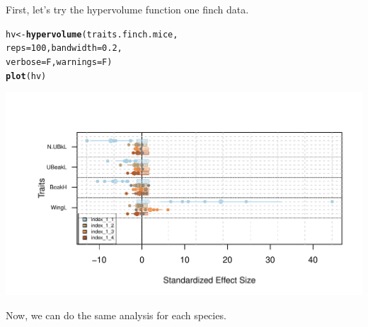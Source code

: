 \documentclass[12pt]{article}\usepackage[]{graphicx}\usepackage[]{color}
\makeatletter
\def\maxwidth{ %
  \ifdim\Gin@nat@width>\linewidth
    \linewidth
  \else
    \Gin@nat@width
  \fi
}
\newcommand{\hlnum}[1]{\textcolor[rgb]{0.686,0.059,0.569}{#1}}%
\newcommand{\hlstd}[1]{\textcolor[rgb]{0.345,0.345,0.345}{#1}}%
\newcommand{\hlkwb}[1]{\textcolor[rgb]{0.69,0.353,0.396}{#1}}%
\newcommand{\hlkwc}[1]{\textcolor[rgb]{0.333,0.667,0.333}{#1}}%
\newcommand{\hlkwd}[1]{\textcolor[rgb]{0.737,0.353,0.396}{\textbf{#1}}}%
\newenvironment{kframe}{%
 \def\at@end@of@kframe{}%
 \ifinner\ifhmode%
  \def\at@end@of@kframe{\end{minipage}}%
  \begin{minipage}{\columnwidth}%
 \fi\fi%
 \def\FrameCommand##1{\hskip\@totalleftmargin \hskip-\fboxsep
 \colorbox{shadecolor}{##1}\hskip-\fboxsep
     \hskip-\linewidth \hskip-\@totalleftmargin \hskip\columnwidth}%
 \MakeFramed {\advance\hsize-\width
   \@totalleftmargin\z@ \linewidth\hsize
   \@setminipage}}%
 {\par\unskip\endMakeFramed%
 \at@end@of@kframe}
\newenvironment{knitrout}{}{} %
\makeatother
\begin{document}
First, let's try the hypervolume function one finch data.
\begin{knitrout}
\color{fgcolor}\begin{kframe}
\begin{alltt}
\hlstd{hv}\hlkwb{<-}\hlkwd{hypervolume}\hlstd{(traits.finch.mice,}
                \hlkwc{reps}\hlstd{=}\hlnum{100}\hlstd{,}\hlkwc{bandwidth}\hlstd{=}\hlnum{0.2}\hlstd{,}
                \hlkwc{verbose}\hlstd{=F,} \hlkwc{warnings}\hlstd{=F)}
\hlkwd{plot}\hlstd{(hv)}
\end{alltt}
\end{kframe}
\includegraphics[width=\maxwidth]{figure/unnamed-chunk-46} 

\end{knitrout}

Now, we can do the same analysis for each species.
\end{document}
